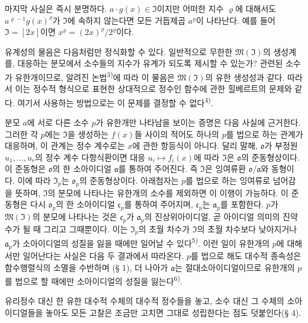마지막 사실은 즉시 분명하다. \(a\cdot g(x)\in\mathfrak I\)이지만 어떠한 지수 \(\varrho\)에 대해서도 \(a^{\varrho-1}g(x)^\varrho\)가 \(\mathfrak I\)에 속하지 않는다면 모든 거듭제곱 \(a^\varrho\)이 나타난다. 예를 들어 \(\mathfrak I=[2x]\)이면 \(x^\varrho=(2x)^\varrho/2^\varrho\)이다.

유계성의 물음은 다음처럼만 정식화할 수 있다. 일반적으로 무한한 \(\mathfrak M(\mathfrak I)\)의 생성계를, 대응하는 분모에서 소수들의 지수가 유계가 되도록 제시할 수 있는가? 관련된 소수가 유한개이므로, 알려진 논법\textsuperscript{3)}에 따라 이 물음은 \(\mathfrak M(\mathfrak I)\)의 유한 생성성과 같다. 따라서 이는 정수적 형식으로 표현한 상대적으로 정수인 함수에 관한 힐베르트의 문제와 같다. 여기서 사용하는 방법으로는 이 문제를 결정할 수 없다\textsuperscript{4)}.

분모 \(a\)에 서로 다른 소수 \(p\)가 유한개만 나타남을 보이는 증명은 다음 사실에 근거한다. 그러한 각 \(p\)에는 \(\mathfrak I\)을 생성하는 \(f(x)\)들 사이의 적어도 하나의 \(p\)를 법으로 하는 관계가 대응하며, 이 관계는 정수 계수로는 \(x\)에 관한 항등식이 아니다. 달리 말해, \(\mathfrak o\)가 부정원 \(u_1,\ldots,u_r\)의 정수 계수 다항식환이면 대응 \(u_i\mapsto f_i(x)\)에 따라 \(\mathfrak I\)은 \(\mathfrak o\)의 준동형상이다. 이 준동형은 \(\mathfrak o\)의 한 소아이디얼 \(\mathfrak a\)를 통하여 주어진다. 즉 \(\mathfrak I\)은 잉여류환 \(\mathfrak o/\mathfrak a\)와 동형이다. 이에 따라 \(\mathfrak I_p\)는 \(\mathfrak o_p\)의 준동형상이다. 아래첨자는 \(p\)를 법으로 하는 잉여류로 넘어감을 뜻하며, \(\mathfrak I\)의 분모에 나타나는 유한개의 소수를 제외하면 이 이행이 가능하다. 이 준동형은 다시 \(\mathfrak o_p\)의 한 소아이디얼 \(\mathfrak c_p\)를 통하여 주어지며, \(\mathfrak c_p\)는 \(\mathfrak a_p\)를 포함한다. \(p\)가 \(\mathfrak M(\mathfrak I)\)의 분모에 나타나는 것은 \(\mathfrak c_p\)가 \(\mathfrak a_p\)의 진상위아이디얼, 곧 아이디얼 의미의 진약수가 될 때 그리고 그때뿐이다. 이는 \(\mathfrak I_p\)의 초월 차수가 \(\mathfrak I\)의 초월 차수보다 낮아지거나 \(\mathfrak a_p\)가 소아이디얼의 성질을 잃을 때에만 일어날 수 있다\textsuperscript{5)}. 이런 일이 유한개의 \(p\)에 대해서만 일어난다는 사실은 다음 두 결과에서 따라온다. \(p\)를 법으로 해도 대수적 종속성은 함수행렬식의 소멸을 수반하며 (§ 1), 더 나아가 \(\mathfrak a\)는 절대소아이디얼이므로 유한개의 \(p\)를 법으로 할 때에만 소아이디얼의 성질을 잃는다\textsuperscript{6)}.

유리정수 대신 한 유한 대수적 수체의 대수적 정수들을 놓고, 소수 대신 그 수체의 소아이디얼들을 놓아도 모든 고찰은 조금만 고치면 그대로 성립한다는 점도 덧붙인다(§ 4).

